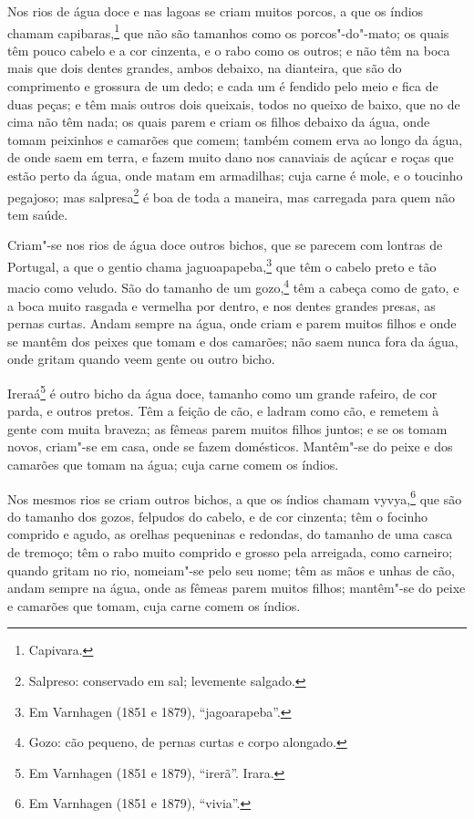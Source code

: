 Nos rios de água doce e nas lagoas se criam muitos porcos, a que os índios chamam
capibaras,\footnote{ Capivara.} que não são tamanhos como os porcos"-do"-mato; os quais têm
pouco cabelo e a cor cinzenta, e o rabo como os outros; e não têm na boca mais que dois
dentes grandes, ambos debaixo, na dianteira, que são do comprimento e grossura de um dedo;
e cada um é fendido pelo meio e fica de duas peças; e têm mais outros dois queixais, todos
no queixo de baixo, que no de cima não têm nada; os quais parem e criam os filhos debaixo
da água, onde tomam peixinhos e camarões que comem; também comem erva ao longo da água, de
onde saem em terra, e fazem muito dano nos canaviais de açúcar e roças que estão perto da
água, onde matam em armadilhas; cuja carne é mole, e o toucinho pegajoso; mas
salpresa\footnote{ Salpreso: conservado em sal; levemente salgado.} é boa de toda a
maneira, mas carregada para quem não tem saúde.

Criam"-se nos rios de água doce outros bichos, que se parecem com lontras de Portugal, a
que o gentio chama jaguoapapeba,\footnote{ Em Varnhagen (1851 e 1879), ``jagoarapeba''.}
que têm o cabelo preto e tão macio como veludo. São do tamanho de um gozo,\footnote{ Gozo:
cão pequeno, de pernas curtas e corpo alongado.} têm a cabeça como de gato, e a boca
muito rasgada e vermelha por dentro, e nos dentes grandes presas, as pernas curtas. Andam
sempre na água, onde criam e parem muitos filhos e onde se mantêm dos peixes que tomam e
dos camarões; não saem nunca fora da água, onde gritam quando veem gente ou outro bicho.

Ireraá\footnote{ Em Varnhagen (1851 e 1879), ``irerã''. Irara.} é outro bicho da água
doce, tamanho como um grande rafeiro, de cor parda, e outros pretos. Têm a feição de cão,
e ladram como cão, e remetem à gente com muita braveza; as fêmeas parem muitos filhos
juntos; e se os tomam novos, criam"-se em casa, onde se fazem domésticos. Mantêm"-se do
peixe e dos camarões que tomam na água; cuja carne comem os índios.

Nos mesmos rios se criam outros bichos, a que os índios chamam vyvya,\footnote{ Em
Varnhagen (1851 e 1879), ``vivia''.} que são do tamanho dos gozos, felpudos do cabelo, e
de cor cinzenta; têm o focinho comprido e agudo, as orelhas pequeninas e redondas, do
tamanho de uma casca de tremoço; têm o rabo muito comprido e grosso pela arreigada, como
carneiro; quando gritam no rio, nomeiam"-se pelo seu nome; têm as mãos e unhas de cão,
andam sempre na água, onde as fêmeas parem muitos filhos; mantêm"-se do peixe e camarões
que tomam, cuja carne comem os índios.

